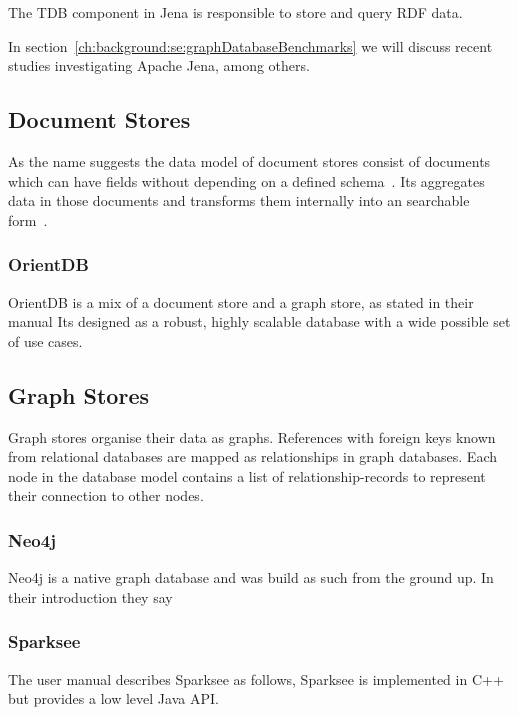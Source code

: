 The TDB component in Jena is responsible to store and query RDF data.~\cite{Apache}

In section~\ref{ch:background:se:graphDatabaseBenchmarks} we will discuss recent studies investigating Apache Jena, among others.

\subsection{Document Stores}
As the name suggests the data model of document stores consist of documents which can have fields without depending on a defined schema~\cite{OrientDB}.
Its aggregates data in those documents and transforms them internally into an searchable form~\cite{Techopedia2017}.

\subsubsection{OrientDB}
OrientDB is a mix of a document store and a graph store,
as stated in their manual 
Its designed as a robust, highly scalable database with a wide possible set of use cases.~\cite{OrientDB}

\subsection{Graph Stores}
\label{ch:background:se:graphStores}
Graph stores organise their data as graphs.
References with foreign keys known from relational databases are mapped as relationships in graph databases.
Each node in the database model contains a list of relationship-records to represent their connection to other nodes.~\cite{NeoTechnologyInc.2016}

\subsubsection{Neo4j}
Neo4j is a native graph database and was build as such from the ground up.
In their introduction they say 

\subsubsection{Sparksee}
The user manual describes Sparksee as follows, 
Sparksee is implemented in C++ but provides a low level Java API.

